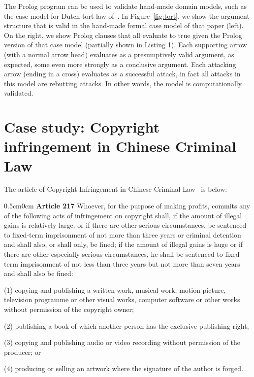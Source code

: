 \documentclass{IOS-Book-Article}
\begin{document}
The Prolog program can be used to validate hand-made domain models, such as the case model for Dutch tort law of~\cite{Verheij2017Formalizing}. In Figure~\ref{fig:tort}, we show the argument structure that is valid in the hand-made formal case model of that paper (left). On the right, we show Prolog clauses that all evaluate to true given the Prolog version of that case model (partially shown in Listing 1). Each supporting arrow (with a normal arrow head) evaluates as a presumptively valid argument, as expected, some even more strongly as a conclusive argument. Each attacking arrow (ending in a cross) evaluates as a successful attack, in fact all attacks in this model are rebutting attacks. In other words, the model is computationally validated.

\begin{figure*}[btp]
	\scalebox{0.7}{}
\caption{The Dutch tort law model: argument structure (left); in Prolog (right)}
\label{fig:tort}
\end{figure*}


\section{Case study: Copyright infringement in Chinese Criminal Law}




\noindent The article of Copyright Infringement in Chinese Criminal Law~\cite{StateCouncil2015series} is below:
\newline

\footnotesize
\begin{adjustwidth}{0.5cm}{0cm}
\noindent \textbf{Article 217} Whoever, for the purpose of making profits, commits any of the following acts of infringement on copyright shall, if the amount of illegal gains is relatively large, or if there are other serious circumstances, be sentenced to fixed-term imprisonment of not more than three years or criminal detention and shall also, or shall only, be fined; if the amount of illegal gains is huge or if there are other especially serious circumstances, he shall be sentenced to fixed-term imprisonment of not less than three years but not more than seven years and shall also be fined:

\noindent (1) copying and publishing a written work, musical work, motion picture, television programme or other visual works, computer software or other works without permission of the copyright owner;

\noindent (2) publishing a book of which another person has the exclusive publishing right;

\noindent (3) copying and publishing audio or video recording without permission of the producer; or

\noindent (4) producing or selling an artwork where the signature of the author is forged.\newline
\end{adjustwidth}
\end{document}
